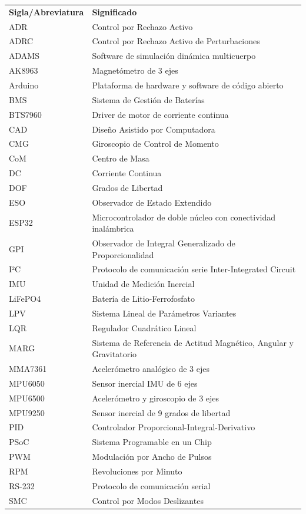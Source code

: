 \documentclass[12pt,letterpaper]{report}
\begin{document}
\vspace{6pt}
\begin{longtable}{ll}
\textbf{Sigla/Abreviatura} & \textbf{Significado} \\[6pt]
ADR & Control por Rechazo Activo \\[6pt]
ADRC & Control por Rechazo Activo de Perturbaciones \\[6pt]
ADAMS & Software de simulación dinámica multicuerpo \\[6pt]
AK8963 & Magnetómetro de 3 ejes \\[6pt]
Arduino & Plataforma de hardware y software de código abierto \\[6pt]
BMS & Sistema de Gestión de Baterías \\[6pt]
BTS7960 & Driver de motor de corriente continua \\[6pt]
CAD & Diseño Asistido por Computadora \\[6pt]
CMG & Giroscopio de Control de Momento \\[6pt]
CoM & Centro de Masa \\[6pt]
DC & Corriente Continua \\[6pt]
DOF & Grados de Libertad \\[6pt]
ESO & Observador de Estado Extendido \\[6pt]
ESP32 & Microcontrolador de doble núcleo con conectividad inalámbrica \\[6pt]
GPI & Observador de Integral Generalizado de Proporcionalidad \\[6pt]
I²C & Protocolo de comunicación serie Inter-Integrated Circuit \\[6pt]
IMU & Unidad de Medición Inercial \\[6pt]
LiFePO4 & Batería de Litio-Ferrofosfato \\[6pt]
LPV & Sistema Lineal de Parámetros Variantes \\[6pt]
LQR & Regulador Cuadrático Lineal \\[6pt]
MARG & Sistema de Referencia de Actitud Magnético, Angular y Gravitatorio \\[6pt]
MMA7361 & Acelerómetro analógico de 3 ejes \\[6pt]
MPU6050 & Sensor inercial IMU de 6 ejes \\[6pt]
MPU6500 & Acelerómetro y giroscopio de 3 ejes \\[6pt]
MPU9250 & Sensor inercial de 9 grados de libertad \\[6pt]
PID & Controlador Proporcional-Integral-Derivativo \\[6pt]
PSoC & Sistema Programable en un Chip \\[6pt]
PWM & Modulación por Ancho de Pulsos \\[6pt]
RPM & Revoluciones por Minuto \\[6pt]
RS-232 & Protocolo de comunicación serial \\[6pt]
SMC & Control por Modos Deslizantes \\
\end{longtable}
\end{document}
